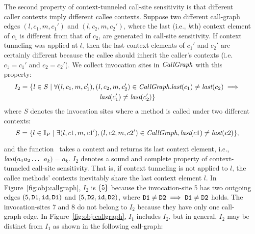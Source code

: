 

The second property of context-tunneled call-site sensitivity is that
different caller contexts imply different callee contexts. Suppose
two different call-graph edges $(l, c_1, m, c_1')$ and
$(l, c_2, m, c_2')$, where the last (i.e., $k$th) context element of $c_1$ is different from that of $c_2$, are generated in call-site sensitivity. 
If context tunneling was applied at $l$, then the last context elements of $c_1'$ and
$c_2'$ are certainly different because the callee should inherit the
caller's contexts (i.e. $c_1 = c_1'$ and $c_2 = c_2'$).
We collect invocation sites in $\textit{CallGraph}$ with this property: %
\begin{multline*}
	I_2 =  \{{\it l} \in S \mid \forall ({\it l}, c_1, m, c_1'), ({\it l}, c_2, m, c_2') \in
	\textit{CallGraph}.  \text{\it last}(c_1) \neq \text{\it last}(c_2) \implies \\ \text{\it last}(c_1') \neq \text{\it last}(c_2')\}
\end{multline*}
where $S$ denotes the invocation sites where a method is called under two different contexts:
\[
S = \{l \in \mathbb{I}_P \mid \exists (l,c1,m,c1'),(l,c2,m,c2')\in \textit{CallGraph},  \text{\it last}(c1) \not = \text{\it last}(c2)\},
\]


and the function \kth~takes a context and returns its last context element, i.e., $\text{\it last}(a_1a_2\dots$ $ a_k) = a_k$.  
 $I_2$ denotes a
sound and complete property of context-tunneled call-site sensitivity. 
That is, if context tunneling is not applied to $l$, the callee methods'
contexts inevitably share the last context element $l$.
In Figure~\ref{fig:obj:callgraph}, $I_2$ is $\{ 5 \}$ because the invocation-site 5
has two outgoing edges $(5,{\tt D1},\texttt{id},{\tt D1})$ and $(5,{\tt
D2},\texttt{id},{\tt D2})$, where ${\tt D1} \neq {\tt
D2} \implies {\tt D1} \neq {\tt D2}$ holds. 
The invocation-sites 7 and 8 do not
belong to $I_2$ because they have only one call-graph edge.
In Figure~\ref{fig:obj:callgraph}, $I_1$ includes $I_2$, but in
general, $I_2$
may be distinct from $I_1$ as shown in the following call-graph:

